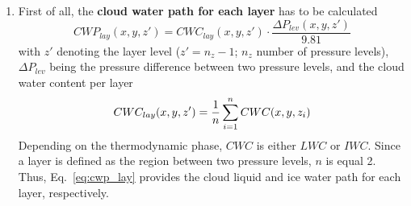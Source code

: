 \begin{enumerate}[label=(\alph*)]
 \item\label{it:cwp_lay} 
First of all, the \textbf{cloud water path for each layer} has to be calculated
\begin{equation}\label{eq:cwp_lay}
  CWP_{lay}(x,y,z') = CWC_{lay}(x,y,z') \cdotp \frac{\Delta P_{lev}(x,y,z')}{9.81}
\end{equation}
with $z'$ denoting the layer level ($z' = n_{z} - 1$; $n_{z}$ number of pressure levels),
$\Delta P_{lev}$ being the pressure difference between two pressure levels, and
the cloud water content per layer
\begin{equation}\label{eq:cwc_lay}
  CWC_{lay}(x,y,z') = \frac{1}{n} \sum\limits_{i=1}^n CWC(x,y,z_{i})\\[1.5ex]
\end{equation}
Depending on the thermodynamic phase, $CWC$ is either $LWC$ or $IWC$.
Since a layer is defined as the region between two pressure levels, $n$ is equal 2.
Thus, Eq.~\ref{eq:cwp_lay} provides the cloud liquid and ice water path for each
layer, respectively.



\end{enumerate}
